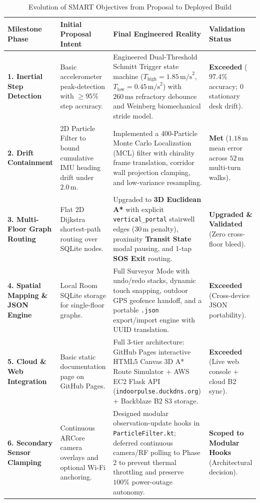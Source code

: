 \documentclass[11pt,a4paper]{article}
\begin{document}
\begin{table}[h!]
\centering
\caption{Evolution of SMART Objectives from Proposal to Deployed Build}
\label{tab:smart_evolution}
\renewcommand{\arraystretch}{1.28}
\footnotesize
\begin{tabularx}{\textwidth}{L{2.5cm} L{3.6cm} Y L{2.4cm}}
\toprule
\textbf{Milestone Phase} & \textbf{Initial Proposal Intent} & \textbf{Final Engineered Reality} & \textbf{Validation Status} \\
\midrule
\textbf{1. Inertial Step Detection} & Basic accelerometer peak-detection with $\ge 95\%$ step accuracy. & Engineered Dual-Threshold Schmitt Trigger state machine ($T_{\text{high}}=1.85\,\text{m/s}^2$, $T_{\text{low}}=0.45\,\text{m/s}^2$) with $260\,\text{ms}$ refractory debounce and Weinberg biomechanical stride model. & \textbf{Exceeded} ($97.4\%$ accuracy; $0$ stationary desk drift). \\
\textbf{2. Drift Containment} & 2D Particle Filter to bound cumulative IMU heading drift under $2.0\,\text{m}$. & Implemented a 400-Particle Monte Carlo Localization (MCL) filter with chirality frame translation, corridor wall projection clamping, and low-variance resampling. & \textbf{Met} ($1.18\,\text{m}$ mean error across $52\,\text{m}$ multi-turn walks). \\
\textbf{3. Multi-Floor Graph Routing} & Flat 2D Dijkstra shortest-path routing over SQLite nodes. & Upgraded to \textbf{3D Euclidean A*} with explicit \texttt{vertical\_portal} stairwell edges ($30\,\text{m}$ penalty), proximity \textbf{Transit State} modal pausing, and 1-tap \textbf{SOS Exit} routing. & \textbf{Upgraded \& Validated} (Zero cross-floor bleed). \\
\textbf{4. Spatial Mapping \& JSON Engine} & Local Room SQLite storage for single-floor graphs. & Full Surveyor Mode with undo/redo stacks, dynamic touch snapping, outdoor GPS geofence handoff, and a portable \texttt{.json} export/import engine with UUID translation. & \textbf{Exceeded} (Cross-device JSON portability). \\
\textbf{5. Cloud \& Web Integration} & Basic static documentation page on GitHub Pages. & Full 3-tier architecture: GitHub Pages interactive HTML5 Canvas 3D A* Route Simulator + AWS EC2 Flask API (\texttt{indoorpulse.duckdns.org}) + Backblaze B2 S3 storage. & \textbf{Exceeded} (Live web console + cloud B2 sync). \\
\textbf{6. Secondary Sensor Clamping} & Continuous ARCore camera overlays and optional Wi-Fi anchoring. & Designed modular observation-update hooks in \texttt{ParticleFilter.kt}; deferred continuous camera/RF polling to Phase 2 to prevent thermal throttling and preserve $100\%$ power-outage autonomy. & \textbf{Scoped to Modular Hooks} (Architectural decision). \\
\bottomrule
\end{tabularx}
\end{table}
\end{document}
